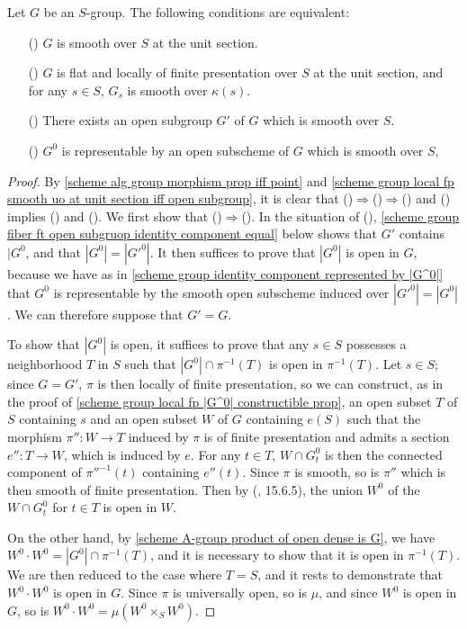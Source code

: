 \begin{theorem}\label{scheme group smooth at unit section iff}
Let $G$ be an $S$-group. The following conditions are equivalent:
\begin{enumerate}
    \item[(\rmnum{1})] $G$ is smooth over $S$ at the unit section.
    \item[(\rmnum{2})] $G$ is flat and locally of finite presentation over $S$ at the unit section, and for any $s\in S$, $G_s$ is smooth over $\kappa(s)$.
    \item[(\rmnum{3})] There exists an open subgroup $G'$ of $G$ which is smooth over $S$.
    \item[(\rmnum{4})] $G^0$ is representable by an open subscheme of $G$ which is smooth over $S$,
\end{enumerate}
\end{theorem}
\begin{proof}
By \cref{scheme alg group morphism prop iff point} and \cref{scheme group local fp smooth uo at unit section iff open subgroup}, it is clear that ()$\Rightarrow$()$\Rightarrow$() and () implies () and (). We first show that ()$\Rightarrow$(). In the situation of (), \cref{scheme group fiber ft open subgruop identity component equal} below shows that $G'$ contains $|G^0$, and that $|G^0|=|G'^0|$. It then suffices to prove that $|G^0|$ is open in $G$, because we have as in \cref{scheme group identity component represented by |G^0|} that $G^0$ is representable by the smooth open subscheme induced over $|G'^0|=|G^0|$. We can therefore suppose that $G'=G$.\par
To show that $|G^0|$ is open, it suffices to prove that any $s\in S$ possesses a neighborhood $T$ in $S$ such that $|G^0|\cap\pi^{-1}(T)$ is open in $\pi^{-1}(T)$. Let $s\in S$; since $G=G'$, $\pi$ is then locally of finite presentation, so we can construct, as in the proof of \cref{scheme group local fp |G^0| constructible prop}, an open subset $T$ of $S$ containing $s$ and an open subset $W$ of $G$ containing $e(S)$ such that the morphism $\pi'':W\to T$ induced by $\pi$ is of finite presentation and admits a section $e'':T\to W$, which is induced by $e$. For any $t\in T$, $W\cap G_t^0$ is then the connected component of $\pi''^{-1}(t)$ containing $e''(t)$. Since $\pi$ is smooth, so is $\pi''$ which is then smooth of finite presentation. Then by (\cite{EGA4-3}, 15.6.5), the union $W^0$ of the $W\cap G_t^0$ for $t\in T$ is open in $W$.\par
On the other hand, by \cref{scheme A-group product of open dense is G}, we have $W^0\cdot W^0=|G^0|\cap\pi^{-1}(T)$, and it is necessary to show that it is open in $\pi^{-1}(T)$. We are then reduced to the case where $T=S$, and it rests to demonstrate that $W^0\cdot W^0$ is open in $G$. Since $\pi$ is universally open, so is $\mu$, and since $W^0$ is open in $G$, so is $W^0\cdot W^0=\mu(W^0\times_SW^0)$.
\end{proof}

